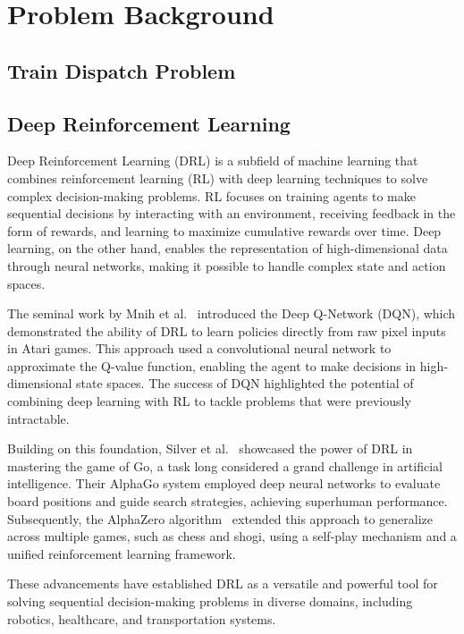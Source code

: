 \documentclass[runningheads]{llncs}
\begin{document}
\section{Problem Background}
\label{sse:background}
\subsection{Train Dispatch Problem}
\label{sss:train}
\subsection{Deep Reinforcement Learning}
\label{sss:reinforcement_learning}
Deep Reinforcement Learning (DRL) is a subfield of machine learning that combines reinforcement learning (RL) with deep learning techniques to solve complex decision-making problems. 
RL focuses on training agents to make sequential decisions by interacting with an environment, receiving feedback in the form of rewards, and learning to maximize cumulative rewards over time. 
Deep learning, on the other hand, enables the representation of high-dimensional data through neural networks, making it possible to handle complex state and action spaces.

The seminal work by Mnih et al.~\cite{drl:Mnih13} introduced the Deep Q-Network (DQN), which demonstrated the ability of DRL to learn policies directly from raw pixel inputs in Atari games. 
This approach used a convolutional neural network to approximate the Q-value function, enabling the agent to make decisions in high-dimensional state spaces. 
The success of DQN highlighted the potential of combining deep learning with RL to tackle problems that were previously intractable.

Building on this foundation, Silver et al.~\cite{drl:silver2017mastering} showcased the power of DRL in mastering the game of Go, a task long considered a grand challenge in artificial intelligence. 
Their AlphaGo system employed deep neural networks to evaluate board positions and guide search strategies, achieving superhuman performance. 
Subsequently, the AlphaZero algorithm~\cite{drl:silver2017alphazero} extended this approach to generalize across multiple games, such as chess and shogi, using a self-play mechanism and a unified reinforcement learning framework.

These advancements have established DRL as a versatile and powerful tool for solving sequential decision-making problems in diverse domains, including robotics, healthcare, and transportation systems.
\end{document}
